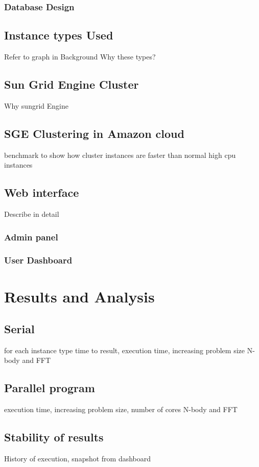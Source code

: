 \documentclass[12pt,a4paper]{report}
\begin{document}
\subsection{Database Design}

\section{Instance types Used}
Refer to graph in Background
Why these types?
\section{Sun Grid Engine Cluster}
Why sungrid Engine
\section{SGE Clustering in Amazon cloud}
  benchmark to show how cluster instances are faster than normal high cpu instances
\section{Web interface}
Describe in detail
\subsection{Admin panel}
\subsection{User Dashboard}

\chapter{Results and Analysis}
\section{Serial}
for each instance type
time to result, execution time, increasing problem size
N-body and FFT

\section{Parallel program}
execution time, increasing problem size, number of cores
N-body and FFT
\section{Stability of results}
History of execution, snapshot from dashboard
\end{document}
